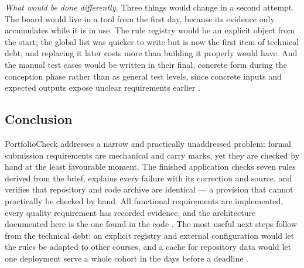 \documentclass[a4paper,11pt]{article}
\begin{document}
\textit{What would be done differently.} Three things would change in a second
attempt. The board would live in a tool from the first day, because its evidence
only accumulates while it is in use. The rule registry would be an explicit
object from the start; the global list was quicker to write but is now the first
item of technical debt, and replacing it later costs more than building it
properly would have. And the manual test cases would be written in their final,
concrete form during the conception phase rather than as general test levels,
since concrete inputs and expected outputs expose unclear requirements earlier
\citep{Avgeriou2023, Winters2020}.

\subsection{Conclusion}\label{sec:conclusion}

PortfolioCheck addresses a narrow and practically unaddressed problem: formal
submission requirements are mechanical and carry marks, yet they are checked by
hand at the least favourable moment. The finished application checks seven rules
derived from the brief, explains every failure with its correction and source,
and verifies that repository and code archive are identical --- a provision that
cannot practically be checked by hand. All functional requirements are
implemented, every quality requirement has recorded evidence, and the
architecture documented here is the one found in the code \citep{Bass2021}. The
most useful next steps follow from the technical debt: an explicit registry and
external configuration would let the rules be adapted to other courses, and a
cache for repository data would let one deployment serve a whole cohort in the
days before a deadline \citep{Ford2021}.

\newpage

\clearpage
{}
\end{document}
